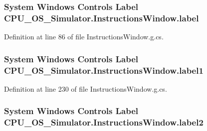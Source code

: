 \subsubsection[{label}]{\setlength{\rightskip}{0pt plus 5cm}System Windows Controls Label C\+P\+U\+\_\+\+O\+S\+\_\+\+Simulator.\+Instructions\+Window.\+label\hspace{0.3cm}{\ttfamily [package]}}\label{class_c_p_u___o_s___simulator_1_1_instructions_window_a71ce6968170dda46d83aefc71b63a96d}


Definition at line 86 of file Instructions\+Window.\+g.\+cs.

\hypertarget{class_c_p_u___o_s___simulator_1_1_instructions_window_a499640eb8a98693f1833dad30f5d8cb4}{}
\subsubsection[{label1}]{\setlength{\rightskip}{0pt plus 5cm}System Windows Controls Label C\+P\+U\+\_\+\+O\+S\+\_\+\+Simulator.\+Instructions\+Window.\+label1\hspace{0.3cm}{\ttfamily [package]}}\label{class_c_p_u___o_s___simulator_1_1_instructions_window_a499640eb8a98693f1833dad30f5d8cb4}


Definition at line 230 of file Instructions\+Window.\+g.\+cs.

\hypertarget{class_c_p_u___o_s___simulator_1_1_instructions_window_a237621e58e68c4a07cdf8803cc1614fd}{}
\subsubsection[{label2}]{\setlength{\rightskip}{0pt plus 5cm}System Windows Controls Label C\+P\+U\+\_\+\+O\+S\+\_\+\+Simulator.\+Instructions\+Window.\+label2\hspace{0.3cm}{\ttfamily [package]}}\label{class_c_p_u___o_s___simulator_1_1_instructions_window_a237621e58e68c4a07cdf8803cc1614fd}


